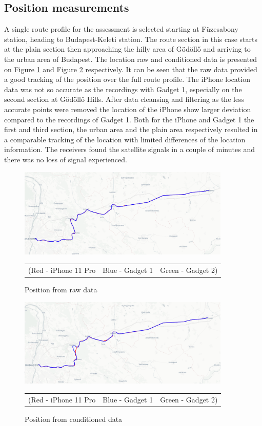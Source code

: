 \documentclass{article}
\begin{document}
			
		\subsection{Position measurements}
			A single route profile for the assessment is selected starting at Füzesabony station, heading to Budapest-Keleti station. The route section in this case starts at the plain section then approaching the hilly area of Gödöllő and arriving to the urban area of Budapest. The location raw and conditioned data is presented on Figure \ref{fig:raw_map} and Figure \ref{fig:cond_map} respectively. It can be seen that the raw data provided a good tracking of the position over the full route profile. The iPhone location data was not so accurate as the recordings with Gadget 1, especially on the second section at Gödöllő Hills. After data cleansing and filtering as the less accurate points were removed the location of the iPhone show larger deviation compared to the recordings of Gadget 1. Both for the iPhone and Gadget 1 the first and third section, the urban area and the plain area respectively resulted in a comparable tracking of the location with limited differences of the location information. The receivers found the satellite signals in a couple of minutes and there was no loss of signal experienced.
			\begin{figure}[h]
				\centering
		      \includegraphics[width=0.9\textwidth]{raw_map.png}
		      \caption{Position from raw data}
		      \begin{tabular}{c c c}
			   		\footnotesize (Red - iPhone 11 Pro & \footnotesize Blue - Gadget 1 & \footnotesize Green - Gadget 2)
		      \end{tabular} 
		      \label{fig:raw_map}
			\end{figure}
			\begin{figure}[h]
				\centering
		   		\includegraphics[width=0.9\textwidth]{cond_map.png}
		   		\caption{Position from conditioned data}
		   		\begin{tabular}{c c c}
					\footnotesize (Red - iPhone 11 Pro & \footnotesize Blue - Gadget 1 & \footnotesize Green - Gadget 2)
		      \end{tabular} 
		      \label{fig:cond_map}
			\end{figure}
\end{document}
